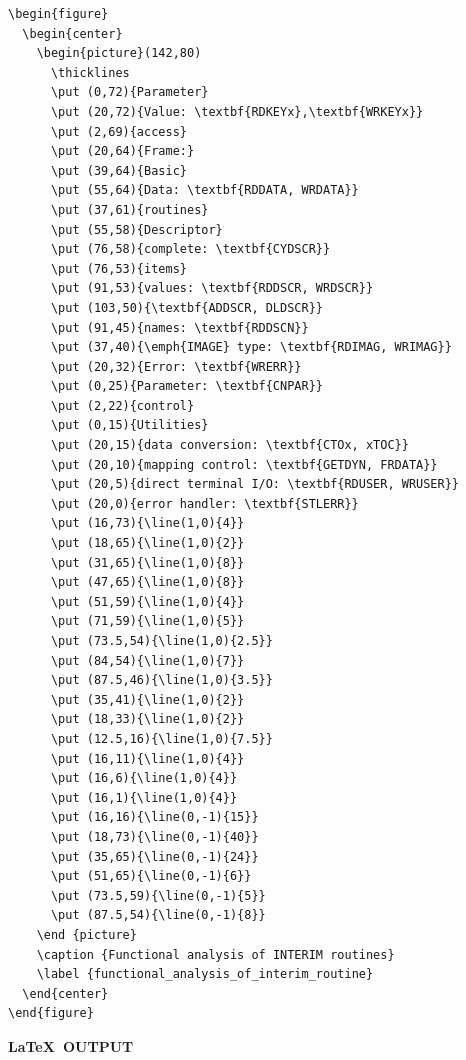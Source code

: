 \documentclass[11pt,twoside]{article}
\begin{document}
\small
\begin{verbatim}
\begin{figure}
  \begin{center}
    \begin{picture}(142,80)
      \thicklines
      \put (0,72){Parameter}
      \put (20,72){Value: \textbf{RDKEYx},\textbf{WRKEYx}}
      \put (2,69){access}
      \put (20,64){Frame:}
      \put (39,64){Basic}
      \put (55,64){Data: \textbf{RDDATA, WRDATA}}
      \put (37,61){routines}
      \put (55,58){Descriptor}
      \put (76,58){complete: \textbf{CYDSCR}}
      \put (76,53){items}
      \put (91,53){values: \textbf{RDDSCR, WRDSCR}}
      \put (103,50){\textbf{ADDSCR, DLDSCR}}
      \put (91,45){names: \textbf{RDDSCN}}
      \put (37,40){\emph{IMAGE} type: \textbf{RDIMAG, WRIMAG}}
      \put (20,32){Error: \textbf{WRERR}}
      \put (0,25){Parameter: \textbf{CNPAR}}
      \put (2,22){control}
      \put (0,15){Utilities}
      \put (20,15){data conversion: \textbf{CTOx, xTOC}}
      \put (20,10){mapping control: \textbf{GETDYN, FRDATA}}
      \put (20,5){direct terminal I/O: \textbf{RDUSER, WRUSER}}
      \put (20,0){error handler: \textbf{STLERR}}
      \put (16,73){\line(1,0){4}}
      \put (18,65){\line(1,0){2}}
      \put (31,65){\line(1,0){8}}
      \put (47,65){\line(1,0){8}}
      \put (51,59){\line(1,0){4}}
      \put (71,59){\line(1,0){5}}
      \put (73.5,54){\line(1,0){2.5}}
      \put (84,54){\line(1,0){7}}
      \put (87.5,46){\line(1,0){3.5}}
      \put (35,41){\line(1,0){2}}
      \put (18,33){\line(1,0){2}}
      \put (12.5,16){\line(1,0){7.5}}
      \put (16,11){\line(1,0){4}}
      \put (16,6){\line(1,0){4}}
      \put (16,1){\line(1,0){4}}
      \put (16,16){\line(0,-1){15}}
      \put (18,73){\line(0,-1){40}}
      \put (35,65){\line(0,-1){24}}
      \put (51,65){\line(0,-1){6}}
      \put (73.5,59){\line(0,-1){5}}
      \put (87.5,54){\line(0,-1){8}}
    \end {picture}
    \caption {Functional analysis of INTERIM routines}
    \label {functional_analysis_of_interim_routine}
  \end{center}
\end{figure}
\end{verbatim}
\normalsize

\newpage

\begin{center}
  \textbf{\LaTeX\ OUTPUT}
\end{center}
\end{document}
